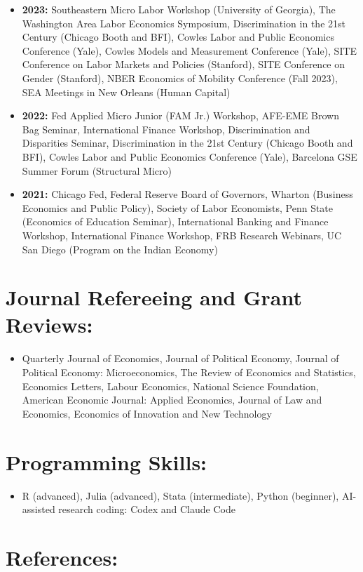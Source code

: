 \documentclass[11pt,letterpaper]{article}
\newcommand{\cvsection}[1]{\Needspace{5\baselineskip}\section*{#1:}}
\begin{document}
\begin{itemize}
\item \textbf{2023:} Southeastern Micro Labor Workshop (University of Georgia), The Washington Area Labor Economics Symposium, Discrimination in the 21st Century (Chicago Booth and BFI), Cowles Labor and Public Economics Conference (Yale), Cowles Models and Measurement Conference (Yale), SITE Conference on Labor Markets and Policies (Stanford), SITE Conference on Gender (Stanford), NBER Economics of Mobility Conference (Fall 2023), SEA Meetings in New Orleans (Human Capital)
\item \textbf{2022:} Fed Applied Micro Junior (FAM Jr.) Workshop, AFE-EME Brown Bag Seminar, International Finance Workshop, Discrimination and Disparities Seminar, Discrimination in the 21st Century (Chicago Booth and BFI), Cowles Labor and Public Economics Conference (Yale), Barcelona GSE Summer Forum (Structural Micro)
\item \textbf{2021:} Chicago Fed, Federal Reserve Board of Governors, Wharton (Business Economics and Public Policy), Society of Labor Economists, Penn State (Economics of Education Seminar), International Banking and Finance Workshop, International Finance Workshop, FRB Research Webinars, UC San Diego (Program on the Indian Economy)
\end{itemize}
\cvsection{Journal Refereeing and Grant Reviews}
\begin{itemize}
\item Quarterly Journal of Economics, Journal of Political Economy, Journal of Political Economy: Microeconomics, The Review of Economics and Statistics, Economics Letters, Labour Economics, National Science Foundation, American Economic Journal: Applied Economics, Journal of Law and Economics, Economics of Innovation and New Technology
\end{itemize}
\cvsection{Programming Skills}
\begin{itemize}
\item R (advanced), Julia (advanced), Stata (intermediate), Python (beginner), AI-assisted research coding: Codex and Claude Code
\end{itemize}
\cvsection{References}
\end{document}
